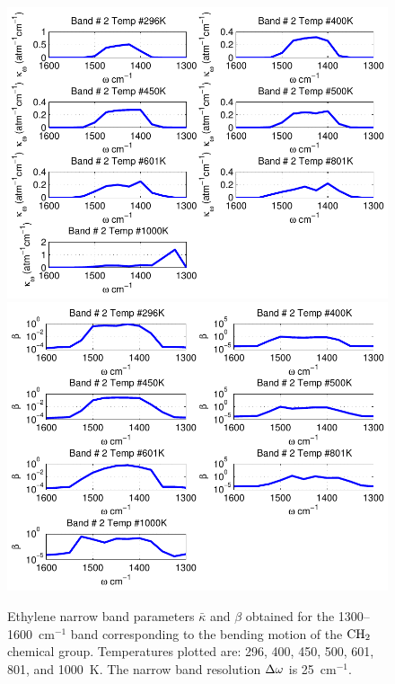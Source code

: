 \begin{figure}[p]
\begin{center}
\includegraphics[width=5.0in]{Figures/Ethylene_Kappa_Band2_MALKMUS.pdf}
\includegraphics[width=5.0in]{Figures/Ethylene_Beta_Band2_MALKMUS.pdf}
\end{center}
\caption{Ethylene narrow band parameters $\bar{\kappa}$ and $\beta$ obtained for the 1300--1600~cm$^{-1}$ band corresponding to the bending motion of the $\rm CH_2$ chemical group. Temperatures plotted are: 296, 400, 450, 500, 601, 801, and 1000~K. The narrow band resolution $\Delta \omega$ is 25~cm$^{-1}$.\label{fig:ethylene_kappa_beta2}}
\end{figure}

